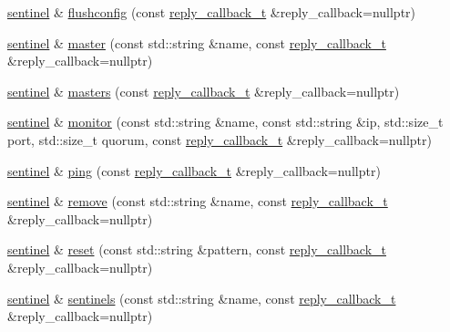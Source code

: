 \begin{DoxyCompactItemize}
\item 
\hyperlink{classcpp__redis_1_1sentinel}{sentinel} \& \hyperlink{classcpp__redis_1_1sentinel_ab3c3a6822ebd512217280b0ca1a0f29f}{flushconfig} (const \hyperlink{classcpp__redis_1_1sentinel_ae1a150ff8787208c47414397a061c9a7}{reply\+\_\+callback\+\_\+t} \&reply\+\_\+callback=nullptr)
\item 
\hyperlink{classcpp__redis_1_1sentinel}{sentinel} \& \hyperlink{classcpp__redis_1_1sentinel_a3d08fbc6ae90b93613f0b3c56a6bf1fe}{master} (const std\+::string \&name, const \hyperlink{classcpp__redis_1_1sentinel_ae1a150ff8787208c47414397a061c9a7}{reply\+\_\+callback\+\_\+t} \&reply\+\_\+callback=nullptr)
\item 
\hyperlink{classcpp__redis_1_1sentinel}{sentinel} \& \hyperlink{classcpp__redis_1_1sentinel_aed4cacf43432630eb2934ce8b8dec104}{masters} (const \hyperlink{classcpp__redis_1_1sentinel_ae1a150ff8787208c47414397a061c9a7}{reply\+\_\+callback\+\_\+t} \&reply\+\_\+callback=nullptr)
\item 
\hyperlink{classcpp__redis_1_1sentinel}{sentinel} \& \hyperlink{classcpp__redis_1_1sentinel_ad4ae72b60a5a03977cda0d3e1f4ee48d}{monitor} (const std\+::string \&name, const std\+::string \&ip, std\+::size\+\_\+t port, std\+::size\+\_\+t quorum, const \hyperlink{classcpp__redis_1_1sentinel_ae1a150ff8787208c47414397a061c9a7}{reply\+\_\+callback\+\_\+t} \&reply\+\_\+callback=nullptr)
\item 
\hyperlink{classcpp__redis_1_1sentinel}{sentinel} \& \hyperlink{classcpp__redis_1_1sentinel_aba0190b2773d4d1f8d5e4c5aac22ce19}{ping} (const \hyperlink{classcpp__redis_1_1sentinel_ae1a150ff8787208c47414397a061c9a7}{reply\+\_\+callback\+\_\+t} \&reply\+\_\+callback=nullptr)
\item 
\hyperlink{classcpp__redis_1_1sentinel}{sentinel} \& \hyperlink{classcpp__redis_1_1sentinel_aee344f7f63bc02d13cb9dce08d48d5d9}{remove} (const std\+::string \&name, const \hyperlink{classcpp__redis_1_1sentinel_ae1a150ff8787208c47414397a061c9a7}{reply\+\_\+callback\+\_\+t} \&reply\+\_\+callback=nullptr)
\item 
\hyperlink{classcpp__redis_1_1sentinel}{sentinel} \& \hyperlink{classcpp__redis_1_1sentinel_a11d5f170474aa881df3b6f3cbbde3569}{reset} (const std\+::string \&pattern, const \hyperlink{classcpp__redis_1_1sentinel_ae1a150ff8787208c47414397a061c9a7}{reply\+\_\+callback\+\_\+t} \&reply\+\_\+callback=nullptr)
\item 
\hyperlink{classcpp__redis_1_1sentinel}{sentinel} \& \hyperlink{classcpp__redis_1_1sentinel_a38436712626f27867ecff225eed87a7f}{sentinels} (const std\+::string \&name, const \hyperlink{classcpp__redis_1_1sentinel_ae1a150ff8787208c47414397a061c9a7}{reply\+\_\+callback\+\_\+t} \&reply\+\_\+callback=nullptr)

\end{DoxyCompactItemize}
